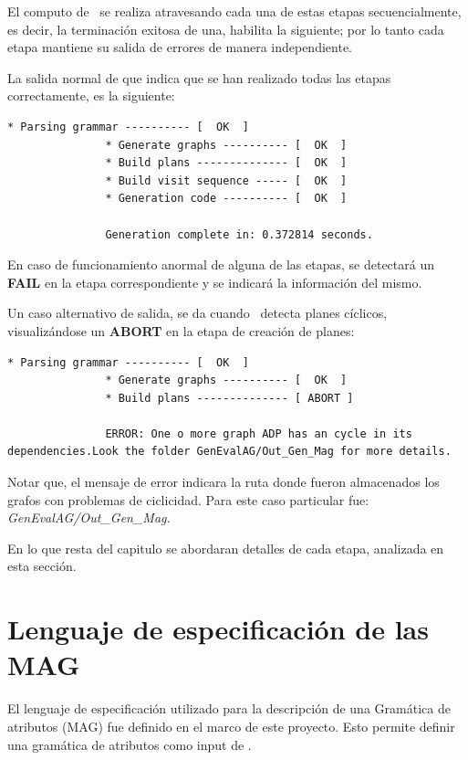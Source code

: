 El computo de \maggen\ se realiza atravesando cada una de estas etapas secuencialmente, es decir, la terminación exitosa de una, habilita la siguiente; por lo tanto cada etapa mantiene su salida de errores de manera independiente. 

La salida normal de \maggen que indica que se han realizado todas las etapas correctamente, es la siguiente:

\begin{lstlisting}[backgroundcolor=\color{white}]
               * Parsing grammar ---------- [  OK  ]
               * Generate graphs ---------- [  OK  ]
               * Build plans -------------- [  OK  ]
               * Build visit sequence ----- [  OK  ]
               * Generation code ---------- [  OK  ]

               Generation complete in: 0.372814 seconds.
\end{lstlisting}

En caso de funcionamiento anormal de alguna de las etapas, se detectará un \textbf{FAIL} en la etapa correspondiente y se indicará la información del mismo.

Un caso alternativo de salida, se da cuando \maggen\ detecta planes cíclicos, visualizándose un \textbf{ABORT} en la etapa de creación de planes:

\begin{lstlisting}[backgroundcolor=\color{white}] 
               * Parsing grammar ---------- [  OK  ]
               * Generate graphs ---------- [  OK  ]
               * Build plans -------------- [ ABORT ]

               ERROR: One o more graph ADP has an cycle in its dependencies.Look the folder GenEvalAG/Out_Gen_Mag for more details.
\end{lstlisting}
Notar que, el mensaje de error indicara la ruta donde fueron almacenados los grafos con problemas de ciclicidad. Para este caso particular fue: \textit{GenEvalAG/Out\_Gen\_Mag.}

En lo que resta del capitulo se abordaran detalles de cada etapa, analizada en esta sección.

\section{Lenguaje de especificación de las MAG}
\label{sec:lenguajeMAG}

El lenguaje de especificación utilizado para la descripción de una Gramática de atributos (MAG) fue definido en el marco de este proyecto. Esto permite definir una gramática de atributos como input de \maggen.
 
